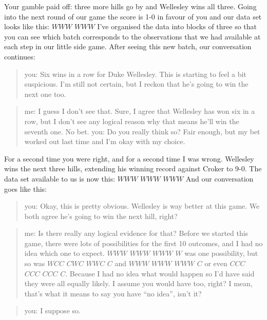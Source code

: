 \documentclass[
  letterpaper,
]{book}
\begin{document}
Your gamble paid off: three more hills go by and Wellesley wins all
three. Going into the next round of our game the score is 1-0 in favour
of you and our data set looks like this: \(WWW\) \(WWW\) I've organised
the data into blocks of three so that you can see which batch
corresponds to the observations that we had available at each step in
our little side game. After seeing this new batch, our conversation
continues:

\begin{quote}
you: Six wins in a row for Duke Wellesley. This is starting to feel a
bit suspicious. I'm still not certain, but I reckon that he's going to
win the next one too.
\end{quote}

\begin{quote}
me: I guess I don't see that. Sure, I agree that Wellesley has won six
in a row, but I don't see any logical reason why that means he'll win
the seventh one. No bet. you: Do you really think so? Fair enough, but
my bet worked out last time and I'm okay with my choice.
\end{quote}

For a second time you were right, and for a second time I was wrong.
Wellesley wins the next three hills, extending his winning record
against Croker to 9-0. The data set available to us is now this: \(WWW\)
\(WWW\) \(WWW\) And our conversation goes like this:

\begin{quote}
you: Okay, this is pretty obvious. Wellesley is way better at this game.
We both agree he's going to win the next hill, right?
\end{quote}

\begin{quote}
me: Is there really any logical evidence for that? Before we started
this game, there were lots of possibilities for the first 10 outcomes,
and I had no idea which one to expect. \(WWW\) \(WWW\) \(WWW\) \(W\) was
one possibility, but so was \(WCC\) \(CWC\) \(WWC\) \(C\) and \(WWW\)
\(WWW\) \(WWW\) \(C\) or even \(CCC\) \(CCC\) \(CCC\) \(C\). Because I
had no idea what would happen so I'd have said they were all equally
likely. I assume you would have too, right? I mean, that's what it means
to say you have ``no idea'', isn't it?
\end{quote}

\begin{quote}
you: I suppose so.
\end{quote}
\end{document}
